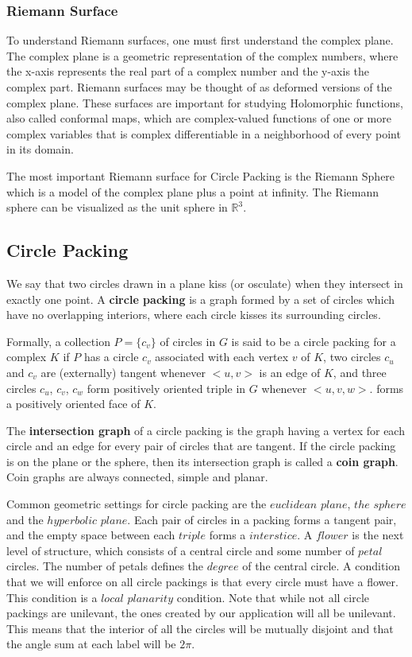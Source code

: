 \documentclass[english]{article}
\begin{document}
  \subsubsection{Riemann Surface}
  To understand Riemann surfaces, one must first understand the complex plane. The complex plane is a geometric representation of the complex numbers, where the x-axis represents the real part of a complex number and the y-axis the complex part. Riemann surfaces may be thought of as deformed versions of the complex plane. These surfaces are important for studying Holomorphic functions, also called conformal maps, which are complex-valued functions of one or more complex variables that is complex differentiable in a neighborhood of every point in its domain.
  
  The most important Riemann surface for Circle Packing is the Riemann Sphere which is a model of the complex plane plus a point at infinity. The Riemann sphere can be visualized as the unit sphere in $\mathbb{R}^3$. 


 \subsection{Circle Packing}
  We say that two circles drawn in a plane kiss (or osculate) when they intersect in exactly one point. 
  A \textbf{circle packing} is a graph formed by a set of circles which have no overlapping interiors, where each circle kisses its surrounding circles.
  
  Formally, a collection $P = \{c_v\} $ of circles in $G$ is said to be a circle packing for a complex $K$ if $P$ has a circle $c_v$ associated with each vertex $v$ of $K$, two circles $c_u$ and $c_v$ are (externally) tangent whenever $<u,v>$ is an edge of $K$, and three circles $c_u$, $c_v$, $c_w$ form positively oriented triple in $G$ whenever $<u,v,w>$. forms a positively oriented face of $K$.
   
  The \textbf{intersection graph} of a circle packing is the graph having a vertex for each circle and an edge for every pair of circles that are tangent. 
  If the circle packing is on the plane or the sphere, then its intersection graph is called a \textbf{coin graph}. 
  Coin graphs are always connected, simple and planar. 

    Common geometric settings for circle packing are the $euclidean$ $plane$, $the$ $sphere$ and the $hyperbolic$ $plane$. Each pair of circles in a packing forms a tangent pair, and the empty space between each $triple$ forms a $interstice$. A $flower$ is the next level of structure, which consists of a central circle and some number of $petal$ circles. The number of petals defines the $degree$ of the central circle. A condition that we will enforce on all circle packings is that every circle must have a flower. This condition is a $local$ $planarity$ condition. Note that while not all circle packings are unilevant, the ones created by our application will all be unilevant. This means that the interior of all the circles will be mutually disjoint and that the angle sum at each label will be $2\pi$.
    
\end{document}
